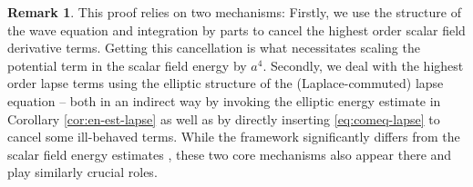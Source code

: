 \documentclass[11pt,leqno,textwidth=10cm]{amsart}
\numberwithin{equation}{section}
\theoremstyle{definition}
\newtheorem{remark}[definition]{Remark}
\theoremstyle{plain}
\newcommand{\1}{\mathbbm{1}}
\begin{document}
\begin{remark}
This proof relies on two mechanisms: Firstly, we use the structure of the wave equation and integration by parts to cancel the highest order scalar field derivative terms. Getting this cancellation is what necessitates scaling the potential term in the scalar field energy by $a^4$. Secondly, we deal with the highest order lapse terms using the elliptic structure of the (Laplace-commuted) lapse equation -- both in an indirect way by invoking the elliptic energy estimate in Corollary \ref{cor:en-est-lapse} as well as by directly inserting \eqref{eq:comeq-lapse} to cancel some ill-behaved terms. While the framework significantly differs from the scalar field energy estimates \cite{Speck2018}, these two core mechanisms also appear there and play similarly crucial roles.
\end{remark}
\end{document}
